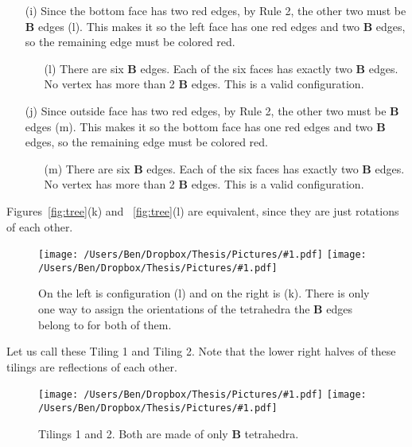 \documentclass[12pt]{scrippsthesis}
\newcommand{\pic}[2]{\texttt{[image: /Users/Ben/Dropbox/Thesis/Pictures/\#1.pdf]}}
\theoremstyle{definition}
\theoremstyle{remark}
\theoremstyle{plain}
\begin{document}
\begin{itemize}
\begin{itemize}
		\begin{itemize}
		\item[(i)] Since the bottom face has two red edges, by Rule 2, the other two must be {\bf B} edges (l).  This makes it so the left face has one red edges and two {\bf B} edges, so the remaining edge must be colored red.
		
			\begin{itemize}
			\item[(l)] There are six {\bf B} edges.  Each of the six faces has exactly two {\bf B} edges.  No vertex has more than 2 {\bf B} edges.  This is a valid configuration.
			
			\end{itemize}
		
		\item[(j)] Since outside face has two red edges, by Rule 2, the other two must be {\bf B} edges (m).  This makes it so the bottom face has one red edges and two {\bf B} edges, so the remaining edge must be colored red.
		
			\begin{itemize}
			\item[(m)] There are six {\bf B} edges.  Each of the six faces has exactly two {\bf B} edges.  No vertex has more than 2 {\bf B} edges.  This is a valid configuration.
			
			\end{itemize}				
		\end{itemize}	
	\end{itemize}
\end{itemize}

Figures~\ref{fig:tree}(k) and ~\ref{fig:tree}(l) are equivalent, since they are just rotations of each other.  

\begin{figure}[H]
\centerline{\hfill
\pic{diagonals1}{width=2in}\hfill
\pic{diagonals2}{width=2in}\hfill
}
\caption{On the left is configuration (l) and on the right is (k).  There is only one way to assign the orientations of the tetrahedra the {\bf B} edges belong to for both of them.}
\end{figure}

Let us call these Tiling 1 and Tiling 2.  Note that the lower right halves of these tilings are reflections of each other.

\begin{figure}[H]
\centerline{\hfill
\pic{Btile1}{width=2.5in}\hfill
\pic{Btile2}{width=2.5in}\hfill}
\caption{Tilings 1 and 2.  Both are made of only {\bf B} tetrahedra.}
\label{fig:tile1and2}
\end{figure}
\end{document}
